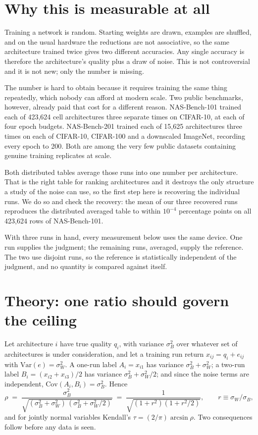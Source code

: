 \documentclass[11pt]{article}
\begin{document}
\section{Why this is measurable at all}\label{sec:why}

Training a network is random. Starting weights are drawn, examples are shuffled, and on the usual
hardware the reductions are not associative, so the same architecture trained twice gives two different
accuracies. Any single accuracy is therefore the architecture's quality plus a draw of noise. This is not
controversial and it is not new; only the number is missing.

The number is hard to obtain because it requires training the same thing repeatedly, which nobody can
afford at modern scale. Two public benchmarks, however, already paid that cost for a different reason.
NAS-Bench-101 trained each of 423,624 cell architectures three separate times on CIFAR-10, at each of
four epoch budgets. NAS-Bench-201 trained each of 15,625 architectures three times on each of CIFAR-10,
CIFAR-100 and a downscaled ImageNet, recording every epoch to 200. Both are among the very few public
datasets containing genuine training replicates at scale.

Both distributed tables average those runs into one number per architecture. That is the right table for
ranking architectures and it destroys the only structure a study of the noise can use, so the first step
here is recovering the individual runs. We do so and check the recovery: the mean of our three recovered
runs reproduces the distributed averaged table to within $10^{-4}$ percentage points on all 423,624 rows
of NAS-Bench-101.

With three runs in hand, every measurement below uses the same device. One run supplies the judgment; the
remaining runs, averaged, supply the reference. The two use disjoint runs, so the reference is
statistically independent of the judgment, and no quantity is compared against itself.

\section{Theory: one ratio should govern the ceiling}\label{sec:theory}

Let architecture $i$ have true quality $q_i$, with variance $\sigma_B^2$ over whatever set of
architectures is under consideration, and let a training run return $x_{ij} = q_i + e_{ij}$ with
$\mathrm{Var}(e) = \sigma_W^2$. A one-run label $A_i = x_{i1}$ has variance $\sigma_B^2 + \sigma_W^2$; a
two-run label $B_i = (x_{i2}+x_{i3})/2$ has variance $\sigma_B^2 + \sigma_W^2/2$; and since the noise
terms are independent, $\mathrm{Cov}(A_i,B_i) = \sigma_B^2$. Hence
\begin{equation}
  \rho \;=\; \frac{\sigma_B^2}{\sqrt{(\sigma_B^2+\sigma_W^2)\,(\sigma_B^2+\sigma_W^2/2)}}
        \;=\; \frac{1}{\sqrt{(1+r^2)(1+r^2/2)}}, \qquad r \equiv \sigma_W/\sigma_B ,
  \label{eq:rho}
\end{equation}
and for jointly normal variables Kendall's $\tau = (2/\pi)\arcsin\rho$. Two consequences follow
before any data is seen.
\end{document}
